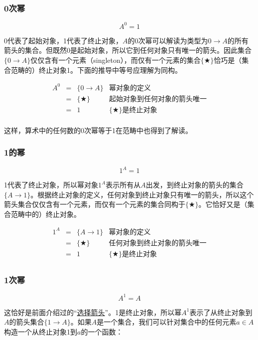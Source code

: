 \documentclass{article}
\begin{document}
\subsubsection{0次幂}

\[
  A^0 = 1
\]

0代表了起始对象，1代表了终止对象，$A$的0次幂可以解读为类型为$0 \to A$的所有箭头的集合。但既然0是起始对象，所以它到任何对象只有唯一的箭头。因此集合$\{ 0 \to A \}$仅仅含有一个元素（singleton），而仅有一个元素的集合$\{ \bigstar \}$恰巧是（集合范畴的）终止对象1。下面的推导中等号应理解为同构。

\[
\begin{array}{rcll}
A^0 & = & \{ 0 \to A \} & \text{幂对象的定义} \\
    & = & \{ \bigstar \} & \text{起始对象到任何对象的箭头唯一} \\
    & = & 1 & \{ \bigstar \}\text{是终止对象} \\
\end{array}
\]

这样，算术中的任何数的0次幂等于1在范畴中也得到了解读。

\subsubsection{1的幂}

\[
  1^A = 1
\]

1代表了终止对象，所以幂对象$1^A$表示所有从$A$出发，到终止对象的箭头的集合$\{ A \to 1 \}$。根据终止对象的定义，任何对象到终止对象只有唯一的箭头，所以这个箭头集合仅仅含有一个元素，而仅有一个元素的集合同构于$\{ \bigstar \}$。它恰好又是（集合范畴中的）终止对象。

\[
\begin{array}{rcll}
1^A & = & \{ A \to 1 \} & \text{幂对象的定义} \\
    & = & \{ \bigstar \} & \text{任何对象到终止对象的箭头唯一} \\
    & = & 1 & \{ \bigstar \}\text{是终止对象} \\
\end{array}
\]

\subsubsection{1次幂}

\[
  A^1 = A
\]

这恰好是前面介绍过的“\hyperref[sec:selection-arrow]{选择箭头}”。1是终止对象，所以幂$A^1$表示了从终止对象到$A$的箭头集合$\{ 1 \to A\}$。如果$A$是一个集合，我们可以针对集合中的任何元素$a \in A$构造一个从终止对象1到$a$的一个函数：
\end{document}
